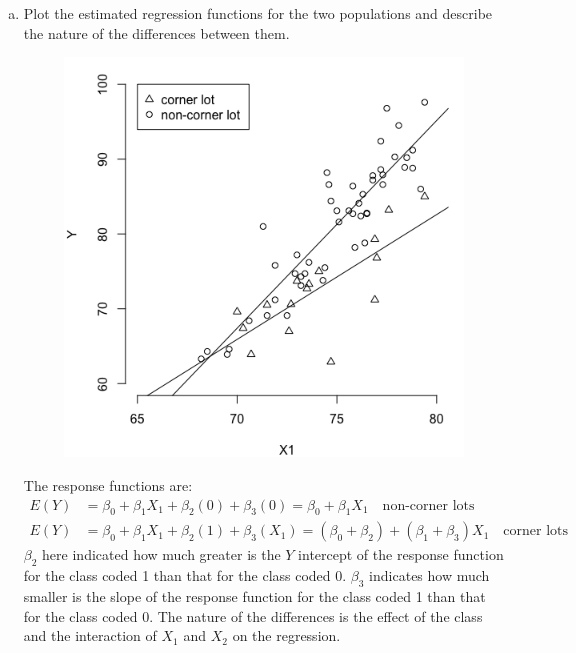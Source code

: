 \documentclass[10pt]{report}
\begin{document}
\begin{enumerate}[a.]
	\item 
	Plot the estimated regression functions for the two populations and describe the nature of the differences between them.
	\begin{figure}[H]
		\centering
		\includegraphics[width=.5\linewidth]{p3/24c.png}
	\end{figure}
	The response functions are:
	\begin{align*}
		E(Y) &= \beta_0 + \beta_1 X_1 + \beta_2(0) + \beta_3(0) = \beta_0 + \beta_1 X_1 \quad \text{non-corner lots}\\
		E(Y) &= \beta_0 + \beta_1 X_1 + \beta_2(1) + \beta_3(X_1) = (\beta_0 + \beta_2) + (\beta_1 + \beta_3) X_1 \quad \text{corner lots}
	\end{align*}
	$\beta_2$ here indicated how much greater is the $Y$ intercept of the response function for the class coded 1 than that for the class coded 0. $\beta_3$ indicates how much smaller is the slope of the response function for the class coded 1 than that for the class coded 0. The nature of the differences is the effect of the class and the interaction of $X_1$ and $X_2$ on the regression.
\end{enumerate}
\end{document}
